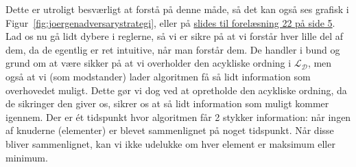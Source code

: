 Dette er utroligt besværligt at forstå på denne måde, så det kan også ses grafisk i Figur~\ref{fig:joergenadversarystrategi}, eller på \href{https://imada.sdu.dk/u/jbj/DM553/Slides21/Lect22.pdf}{slides til forelæsning 22 på side 5}. Lad os nu gå lidt dybere i reglerne, så vi er sikre på at vi forstår hver lille del af dem, da de egentlig er ret intuitive, når man forstår dem. De handler i bund og grund om at være sikker på at vi overholder den acykliske ordning i $\mathcal{L_{D}}$, men også at vi (som modstander) lader algoritmen få så lidt information som overhovedet muligt. Dette gør vi dog ved at opretholde den acykliske ordning, da de sikringer den giver os, sikrer os at så lidt information som muligt kommer igennem. Der er ét tidspunkt hvor algoritmen får 2 stykker information: når ingen af knuderne (elementer) er blevet sammenlignet på noget tidspunkt. Når disse bliver sammenlignet, kan vi ikke udelukke om hver element er maksimum eller minimum.

